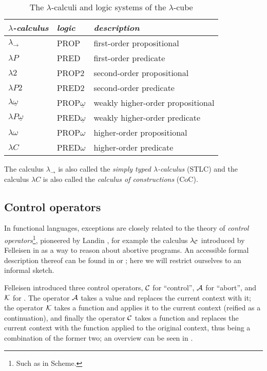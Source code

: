 \begin{table}
\centering
\begin{tabular}{lll}
\toprule
\textit{$\lambda$-calculus} & \textit{logic} & \textit{description} \\
\midrule
$\lambda_\to$ & PROP & first-order propositional \\
$\lambda{}P$ & PRED & first-order predicate \\
$\lambda{}2$ & PROP2 & second-order propositional \\
$\lambda{}P2$ & PRED2 & second-order predicate \\
$\lambda\underline{\omega}$ & PROP$\underline{\omega}$ & weakly higher-order propositional \\
$\lambda{}P\underline{\omega}$& PRED$\underline{\omega}$ & weakly higher-order predicate \\
$\lambda\omega$ & PROP$\omega$ & higher-order propositional \\
$\lambda{}C$ & PRED$\omega$ & higher-order predicate \\
\bottomrule
\end{tabular}

\vspace{6pt}
{\small The calculus $\lambda_\to$ is also called the \emph{simply typed $\lambda$-calculus} (STLC)
and the calculus $\lambda{}C$ is also called the \emph{calculus of constructions} (CoC).}
\caption{The $\lambda$-calculi and logic systems of the $\lambda$-cube \cite{barendregt91}}
\label{tab:lambda-cube}
\end{table}


\subsection{Control operators}

In functional languages, exceptions are closely related to the theory of
\emph{control operators}\footnote{Such as  in Scheme.},
pioneered by Landin \cite{landin65, thielecke98},
for example the calculus $\lambda_{\mathcal{C}}$ introduced by Felleisen in \cite{felleisen87}
as a way to reason about abortive programs. An accessible formal description
thereof can be found in \cite[p.~876, Section~3]{ariola-herbelin} or
\cite{griffin90}; here we will restrict ourselves to an informal sketch.

Felleisen introduced three control operators, $\mathcal{C}$ for ``control'', $\mathcal{A}$
for ``abort'', and $\mathcal{K}$ for . The operator $\mathcal{A}$
takes a value and replaces the current context with it; the operator $\mathcal{K}$
takes a function and applies it to the current context (reified as a continuation),
and finally the operator $\mathcal{C}$ takes a function and replaces the current context
with the function applied to the original context, thus being a combination of
the former two; an overview can be seen in .

